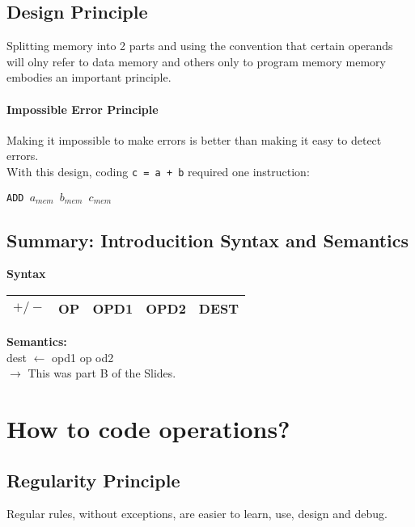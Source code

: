      \subsection{Design Principle}
     Splitting memory into 2 parts and using the convention that certain operands will olny refer  to data memory and others only to program memory memory embodies an important principle.
     \paragraph{Impossible Error Principle}
     Making it impossible to make errors is better than making it easy to detect errors.\\
     With this design, coding \texttt{c = a + b} required one instruction:
     \begin{center}
        \texttt{ADD $a_{mem}$ $b_{mem}$ $c_{mem}$}
     \end{center}

     \subsection{Summary: Introducition Syntax and Semantics}
     \textbf{Syntax}\\
     \begin{center}
        \begin{tabular}{c|c|c|c|c|}
            \hline
            $+/-$ & OP & OPD1 & OPD2 & DEST\\
            \hline
        \end{tabular}
     \end{center}
     \textbf{Semantics:}\\
     dest $\leftarrow$ opd1 op od2\\
     $\rightarrow$ This was part B of the Slides.

     \section{How to code operations?}
     \subsection{Regularity Principle}
     Regular rules, without exceptions, are easier to learn, use, design and debug.\\

